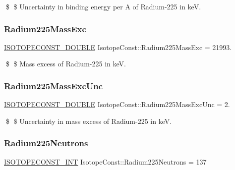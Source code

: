 \$ \$ Uncertainty in binding energy per A of Radium-\/225 in keV. \mbox{\label{group___isotope_const-_radium-_ra225_gaf5c7bdb0575e4c892258792d58313612}} 
\subsubsection{\texorpdfstring{Radium225\+Mass\+Exc}{Radium225MassExc}}
{\footnotesize\ttfamily \mbox{\hyperlink{group___isotope_const-_macros_ga8f45a7272ce02c0b4c65c44636ed719a}{I\+S\+O\+T\+O\+P\+E\+C\+O\+N\+S\+T\+\_\+\+D\+O\+U\+B\+LE}} Isotope\+Const\+::\+Radium225\+Mass\+Exc = 21993.}

\$ \$ Mass excess of Radium-\/225 in keV. \mbox{\label{group___isotope_const-_radium-_ra225_ga9a69b87d41d8f97d6198fe211d8c5e33}} 
\subsubsection{\texorpdfstring{Radium225\+Mass\+Exc\+Unc}{Radium225MassExcUnc}}
{\footnotesize\ttfamily \mbox{\hyperlink{group___isotope_const-_macros_ga8f45a7272ce02c0b4c65c44636ed719a}{I\+S\+O\+T\+O\+P\+E\+C\+O\+N\+S\+T\+\_\+\+D\+O\+U\+B\+LE}} Isotope\+Const\+::\+Radium225\+Mass\+Exc\+Unc = 2.}

\$ \$ Uncertainty in mass excess of Radium-\/225 in keV. \mbox{\label{group___isotope_const-_radium-_ra225_gac2692ce0cbf1dfe123369ef953519fb7}} 
\subsubsection{\texorpdfstring{Radium225\+Neutrons}{Radium225Neutrons}}
{\footnotesize\ttfamily \mbox{\hyperlink{group___isotope_const-_macros_ga5f18360b3e99483a35c32d789e62621c}{I\+S\+O\+T\+O\+P\+E\+C\+O\+N\+S\+T\+\_\+\+I\+NT}} Isotope\+Const\+::\+Radium225\+Neutrons = 137}

